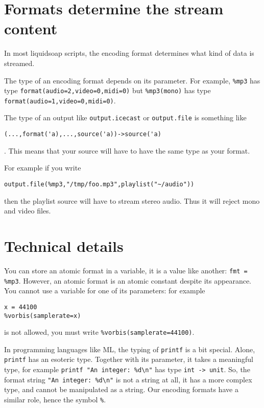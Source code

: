 \section{Formats determine the stream content}
In most liquidsoap scripts, the encoding format determines what
kind of data is streamed.

The type of an encoding format depends on its parameter.
For example, \verb+%mp3+ has type \verb+format(audio=2,video=0,midi=0)+
but \verb+%mp3(mono)+ has type \verb+format(audio=1,video=0,midi=0)+.

The type of an output like \verb+output.icecast+
or \verb+output.file+ is something like
\begin{verbatim}
(...,format('a),...,source('a))->source('a)
\end{verbatim}
.
This means that your source will have to have the same type as your format.

For example if you write
\begin{verbatim}
output.file(%mp3,"/tmp/foo.mp3",playlist("~/audio"))
\end{verbatim}

then the playlist source will have to stream stereo audio.
Thus it will reject mono and video files.

\section{Technical details}
You can store an atomic format in a variable, it is a value like another:
\verb+fmt = %mp3+. However, an atomic format is an atomic constant despite its
appearance. You cannot use a variable for one of its parameters: for
example 

\begin{verbatim}
x = 44100
%vorbis(samplerate=x)
\end{verbatim}
is not allowed,
you must write \verb+%vorbis(samplerate=44100)+.

In programming languages like ML, the typing of \verb+printf+ is a bit special.
Alone, \verb+printf+ has an esoteric type. Together with its parameter, it
takes a meaningful type, for example \verb+printf "An integer: %d\n"+ has type
\verb+int -> unit+. So, the format string \verb+"An integer: %d\n"+ is not a string
at all, it has a more complex type, and cannot be manipulated as a string.
Our encoding formats have a similar role, hence the symbol \verb+%+.





